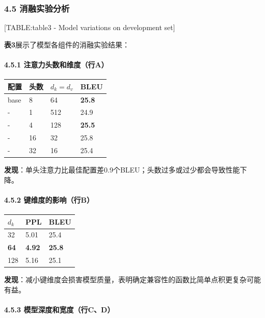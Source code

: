 \documentclass[11pt,a4paper]{article}
\begin{document}
\subsubsection*{4.5 消融实验分析}

[TABLE:table3 - Model variations on development set]

\textbf{表3}展示了模型各组件的消融实验结果：

\paragraph{4.5.1 注意力头数和维度（行A）}

\begin{center}
\begin{tabular}{|l|l|l|l|}
\hline
配置 & 头数 & $d_k = d_v$ & BLEU \\
\hline
base & 8 & 64 & \textbf{25.8} \\
\hline
- & 1 & 512 & 24.9 \\
\hline
- & 4 & 128 & \textbf{25.5} \\
\hline
- & 16 & 32 & 25.8 \\
\hline
- & 32 & 16 & 25.4 \\
\hline
\end{tabular}
\end{center}

\textbf{发现}：单头注意力比最佳配置差0.9个BLEU；头数过多或过少都会导致性能下降。

\paragraph{4.5.2 键维度的影响（行B）}

\begin{center}
\begin{tabular}{|l|l|l|}
\hline
$d_k$ & PPL & BLEU \\
\hline
32 & 5.01 & 25.4 \\
\hline
\textbf{64} & \textbf{4.92} & \textbf{25.8} \\
\hline
128 & 5.16 & 25.1 \\
\hline
\end{tabular}
\end{center}

\textbf{发现}：减小键维度会损害模型质量，表明确定兼容性的函数比简单点积更复杂可能有益。

\paragraph{4.5.3 模型深度和宽度（行C、D）}
\end{document}
